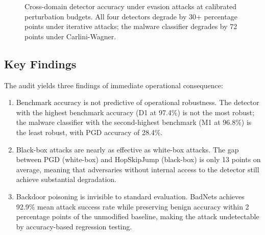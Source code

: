 \documentclass[sigconf,nonacm]{acmart}
\begin{document}
\begin{figure}[h]
\centering
{}
\caption{Cross-domain detector accuracy under evasion attacks at calibrated
  perturbation budgets. All four detectors degrade by 30+ percentage points
  under iterative attacks; the malware classifier degrades by 72 points under
  Carlini-Wagner.}
\label{fig:robustness_chart}
\end{figure}

\subsection{Key Findings}

The audit yields three findings of immediate operational consequence:

\begin{enumerate}
  \item Benchmark accuracy is not predictive of operational robustness. The
        detector with the highest benchmark accuracy (D1 at 97.4\%) is not the
        most robust; the malware classifier with the second-highest benchmark
        (M1 at 96.8\%) is the least robust, with PGD accuracy of 28.4\%.
  \item Black-box attacks are nearly as effective as white-box attacks. The
        gap between PGD (white-box) and HopSkipJump (black-box) is only
        13 points on average, meaning that adversaries without internal
        access to the detector still achieve substantial degradation.
  \item Backdoor poisoning is invisible to standard evaluation. BadNets
        achieves 92.9\% mean attack success rate while preserving benign
        accuracy within 2 percentage points of the unmodified baseline,
        making the attack undetectable by accuracy-based regression testing.
\end{enumerate}
\end{document}
